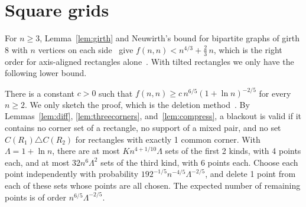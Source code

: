 \section{Square grids}\label{sec:square}

For $n\ge3$, Lemma~\ref{lem:girth} and Neuwirth's bound for bipartite graphs of girth $8$ with
$n$ vertices on each side~\cite[Corollary~16]{neuwirth2001} give
$f(n,n)<n^{4/3}+\tfrac23\,n$, which is the right order for axis-aligned rectangles
alone~\cite{benson1966}. With tilted rectangles we only have the following lower bound.

\begin{remark}\label{rem:square}
There is a constant $c>0$ such that $f(n,n)\ge c\,n^{6/5}(1+\ln n)^{-2/5}$ for every
$n\ge2$. We only sketch the proof, which is the deletion
method~\cite[Section~3.2]{alonspencer2016}. By Lemmas~\ref{lem:diff},
\ref{lem:threecorners}, and~\ref{lem:compress}, a blackout is valid if it contains no
corner set of a rectangle, no support of a mixed pair, and no set
$C(R_1)\triangle C(R_2)$ for rectangles with exactly 1 common corner. With
$\Lambda=1+\ln n$, there are at most $Kn^{4+1/10}\Lambda$ sets of the first 2 kinds, with 4
points each, and at most $32n^6\Lambda^2$ sets of the third kind, with 6 points each.
Choose each point independently with probability $192^{-1/5}n^{-4/5}\Lambda^{-2/5}$, and
delete 1 point from each of these sets whose points are all chosen. The expected number of
remaining points is of order $n^{6/5}\Lambda^{-2/5}$.
\end{remark}

